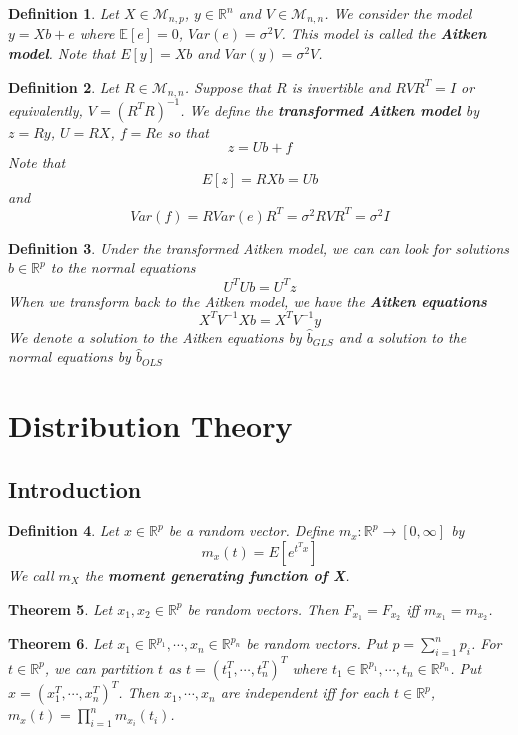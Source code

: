 \documentclass[12pt]{amsart}
\newtheorem{thm}{Theorem}[section]
\newtheorem{defn}[thm]{Definition}
\newcommand{\sig}{\sigma}
\newcommand{\E}{\mathbb{E}}
\newcommand{\R}{\mathbb{R}}
\newcommand{\MM}{\mathcal{M}}
\newcommand{\RG}{[0,\infty]}
\begin{document}
\begin{defn}
Let $X \in \MM_{n,p}$, $y \in \R^n$ and $V \in \MM_{n,n}$. We consider the model $y = Xb + e$ where $\E[e] = 0$, $Var(e) = \sig^2V$. This model is called the \textbf{Aitken model}. Note that $E[y] = Xb$ and $Var(y) = \sig^2 V$.
\end{defn}

\begin{defn}
Let $R \in \MM_{n,n}$. Suppose that $R$ is invertible and $RVR^T = I$ or equivalently, $V = (R^TR)^{-1}$. We define the \textbf{transformed Aitken model} by $z = Ry$, $U = RX$, $f = Re$ so that $$z = Ub + f$$ Note that $$E[z] = RXb = Ub$$ and $$Var(f) = RVar(e)R^T = \sig^2RVR^T = \sig^2I$$ 
\end{defn}

\begin{defn}
Under the transformed Aitken model, we can can look for solutions $b \in \R^p$ to the normal equations $$U^TUb = U^Tz$$ When we transform back to the Aitken model, we have the \textbf{Aitken equations} $$X^TV^{-1}Xb = X^TV^{-1}y$$ We denote a solution to the Aitken equations by $\hat{b}_{GLS}$ and a solution to the normal equations by $\hat{b}_{OLS}$
\end{defn}

\section{Distribution Theory}

\subsection{Introduction}

\begin{defn}
Let $x \in \R^p$ be a random vector. Define $m_x: \R^p \rightarrow \RG$ by $$m_x(t) = E[e^{t^Tx}]$$ We call $m_X$ the \textbf{moment generating function of X}.
\end{defn}

\begin{thm}
Let $x_1, x_2 \in \R^p$ be random vectors. Then $F_{x_1} = F_{x_2}$ iff $m_{x_1} = m_{x_2}$.
\end{thm}

\begin{thm}
Let $x_1 \in \R^{p_1}, \cdots, x_n \in \R^{p_n}$ be random vectors. Put $p = \sum\limits_{i=1}^n p_i$. For $t \in \R^{p}$, we can partition $t$ as $t = (t_1^T, \cdots, t_n^T)^T$ where $t_1 \in \R^{p_1}, \cdots, t_n \in \R^{p_n}$. Put $x = (x_1^T, \cdots, x_n^T)^T$. Then $x_1, \cdots, x_n$ are independent iff for each $t \in \R^p$, $m_x(t) = \prod\limits_{i=1}^nm_{x_i}(t_i)$. 
\end{thm}
\end{document}
